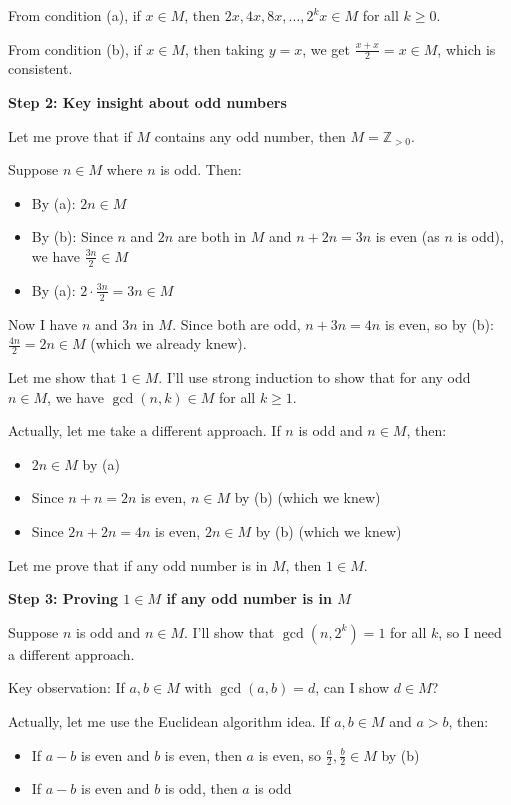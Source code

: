 \documentclass[12pt,a4paper]{article}
\theoremstyle{definition}
\begin{document}
    From condition (a), if $x \in M$, then $2x, 4x, 8x, \ldots, 2^k x \in M$ for all $k \geq 0$.

    From condition (b), if $x \in M$, then taking $y = x$, we get $\frac{x + x}{2} = x \in M$, which is consistent.

    \textbf{Step 2: Key insight about odd numbers}

    Let me prove that if $M$ contains any odd number, then $M = \mathbb{Z}_{>0}$.

    Suppose $n \in M$ where $n$ is odd. Then:
    \begin{itemize}
        \item By (a): $2n \in M$
        \item By (b): Since $n$ and $2n$ are both in $M$ and $n + 2n = 3n$ is even (as $n$ is odd), we have $\frac{3n}{2} \in M$
        \item By (a): $2 \cdot \frac{3n}{2} = 3n \in M$
    \end{itemize}

    Now I have $n$ and $3n$ in $M$. Since both are odd, $n + 3n = 4n$ is even, so by (b): $\frac{4n}{2} = 2n \in M$ (which we already knew).

    Let me show that $1 \in M$. I'll use strong induction to show that for any odd $n \in M$, we have $\gcd(n, k) \in M$ for all $k \geq 1$.

    Actually, let me take a different approach. If $n$ is odd and $n \in M$, then:
    \begin{itemize}
        \item $2n \in M$ by (a)
        \item Since $n + n = 2n$ is even, $n \in M$ by (b) (which we knew)
        \item Since $2n + 2n = 4n$ is even, $2n \in M$ by (b) (which we knew)
    \end{itemize}

    Let me prove that if any odd number is in $M$, then $1 \in M$.

    \textbf{Step 3: Proving $1 \in M$ if any odd number is in $M$}

    Suppose $n$ is odd and $n \in M$. I'll show that $\gcd(n, 2^k) = 1$ for all $k$, so I need a different approach.

    Key observation: If $a, b \in M$ with $\gcd(a,b) = d$, can I show $d \in M$?

    Actually, let me use the Euclidean algorithm idea. If $a, b \in M$ and $a > b$, then:
    \begin{itemize}
        \item If $a - b$ is even and $b$ is even, then $a$ is even, so $\frac{a}{2}, \frac{b}{2} \in M$ by (b)
        \item If $a - b$ is even and $b$ is odd, then $a$ is odd
    \end{itemize}
\end{document}

